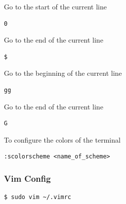 \documentclass{article}
\newenvironment{codetemplate}[1][]{%
  \mybasecolorbox[#1]
  \itshape
}{%
  \endmybasecolorbox
}
\begin{document}
Go to the start of the current line
\begin{codetemplate}
\begin{verbatim}
0
\end{verbatim}
\end{codetemplate}

Go to the end of the current line
\begin{codetemplate}
\begin{verbatim}
$
\end{verbatim}
\end{codetemplate}

Go to the beginning of the current line
\begin{codetemplate}
\begin{verbatim}
gg
\end{verbatim}
\end{codetemplate}

Go to the end of the current line
\begin{codetemplate}
\begin{verbatim}
G
\end{verbatim}
\end{codetemplate}

To configure the colors of the terminal
\begin{codetemplate}
\begin{verbatim}
:scolorscheme <name_of_scheme>
\end{verbatim}
\end{codetemplate}

\subsubsection{Vim Config}

\begin{codetemplate}{}
\begin{verbatim}
$ sudo vim ~/.vimrc
\end{verbatim}
\end{codetemplate}
\end{document}
